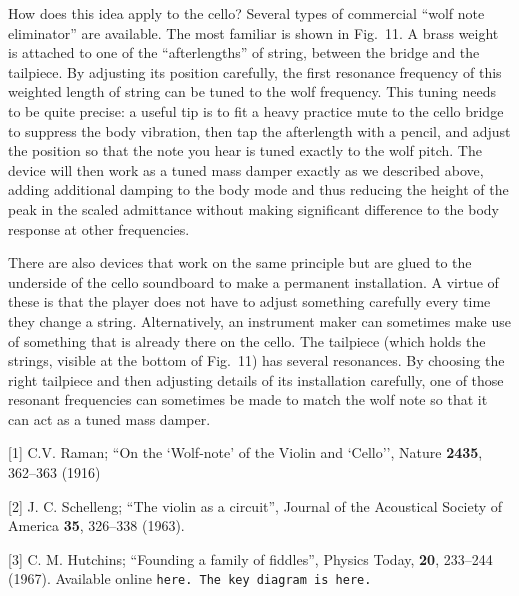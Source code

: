   How does this idea apply to the cello? Several types of commercial “wolf note 
  eliminator” are available. The most familiar is shown in Fig.\ 11. A brass 
  weight is attached to one of the “afterlengths” of string, between the bridge 
  and the tailpiece. By adjusting its position carefully, the first resonance 
  frequency of this weighted length of string can be tuned to the wolf 
  frequency. This tuning needs to be quite precise: a useful tip is to fit a 
  heavy practice mute to the cello bridge to suppress the body vibration, then 
  tap the afterlength with a pencil, and adjust the position so that the note 
  you hear is tuned exactly to the wolf pitch. The device will then work as a 
  tuned mass damper exactly as we described above, adding additional damping to 
  the body mode and thus reducing the height of the peak in the scaled 
  admittance without making significant difference to the body response at 
  other frequencies. 

  There are also devices that work on the same principle but are glued to the 
  underside of the cello soundboard to make a permanent installation. A virtue 
  of these is that the player does not have to adjust something carefully every 
  time they change a string. Alternatively, an instrument maker can sometimes 
  make use of something that is already there on the cello. The tailpiece 
  (which holds the strings, visible at the bottom of Fig.\ 11) has several 
  resonances. By choosing the right tailpiece and then adjusting details of its 
  installation carefully, one of those resonant frequencies can sometimes be 
  made to match the wolf note so that it can act as a tuned mass damper. 



  \sectionreferences{}[1] C.V. Raman; ``On the `Wolf-note' of the Violin and 
  `Cello'', Nature \textbf{2435}, 362--363 (1916) 

  [2] J. C. Schelleng; ``The violin as a circuit'', Journal of the Acoustical 
  Society of America \textbf{35}, 326--338 (1963). 

  [3] C. M. Hutchins; ``Founding a family of fiddles'', Physics Today, 
  \textbf{20}, 233--244 (1967). Available online \tt{}here\rm{}. The key 
  diagram is \tt{}here\rm{}. 